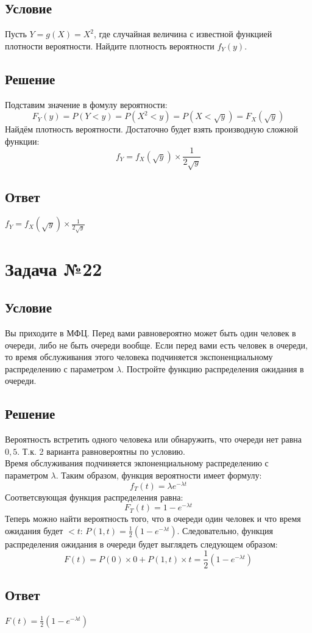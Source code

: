 \documentclass{article}
\begin{document}
\subsection*{Условие}
Пусть \(Y = g(X) = X^2\), где случайная величина с известной функцией
плотности вероятности. Найдите плотность вероятности \(f_Y(y)\).
\subsection*{Решение}
Подставим значение в фомулу вероятности:
\[
    F_Y(y) = P (Y < y) = P (X^2 < y) = P (X < \sqrt{y}) = F_X(\sqrt{y})
\]
Найдём плотность вероятности. Достаточно будет взять производную сложной функции:
\[
    f_Y = f_X(\sqrt{y}) \times \frac{1}{2\sqrt{y}}
\]
\subsection*{Ответ}
$f_Y = f_X(\sqrt{y}) \times \frac{1}{2\sqrt{y}}$
\section*{Задача №22}
\subsection*{Условие}
Вы приходите в МФЦ. Перед вами равновероятно может быть один человек
в очереди, либо не быть очереди вообще. Если перед вами есть человек в очереди, то
время обслуживания этого человека подчиняется экспоненциальному распределению
с параметром \(\lambda\). Постройте функцию распределения ожидания в очереди. 
\subsection*{Решение}
Вероятность встретить одного человека или обнаружить, что очереди нет равна $0,5$. Т.к. 2 варианта равновероятны по условию.\\
Время обслуживания подчиняется экпоненциальному распределению с параметром $\lambda$. Таким образом, функция вероятности имеет формулу:
\[
    f_T(t) = \lambda e^{-\lambda t}
\]
Соответсвующая функция распределения равна:
\[
    F_T(t) =1 - e^{-\lambda t}
\]
Теперь можно найти вероятность того, что в очереди один человек и что время ожидания будет $< t$: $P(1, t) = \frac{1}{2}(1 - e^{-\lambda t})$.
Следовательно, функция распределения ожидания в очереди будет выглядеть следующем образом:
\[
    F(t) = P(0) \times 0 + P(1, t)\times t = \frac{1}{2}(1 - e^{-\lambda t})
\] 
\subsection*{Ответ}
$F( t) = \frac{1}{2}(1 - e^{-\lambda t})$
\end{document}
